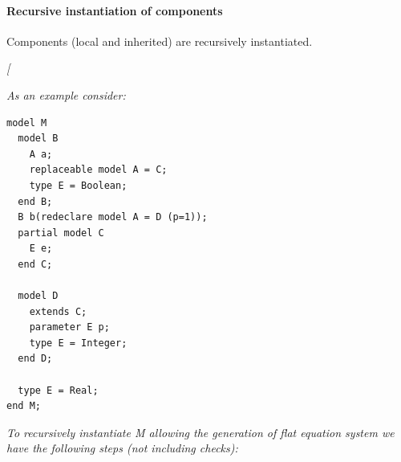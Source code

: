 \documentclass[10pt,a4paper]{report}
\def\doublelabel#1{\label{#1}}
\begin{document}
\paragraph{Recursive instantiation of components}\doublelabel{recursive-instantiation-of-components}

Components (local and inherited) are recursively instantiated.

\emph{{[}}

\emph{As an example consider: }
\begin{lstlisting}[language=modelica]
model M
  model B
    A a;
    replaceable model A = C;
    type E = Boolean;
  end B;
  B b(redeclare model A = D (p=1));
  partial model C
    E e;
  end C;

  model D
    extends C;
    parameter E p;
    type E = Integer;
  end D;

  type E = Real;
end M;
\end{lstlisting}

\emph{To recursively instantiate M allowing the generation of flat
equation system we have the following steps (not including checks):}
\end{document}
